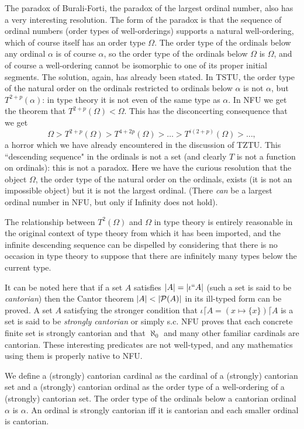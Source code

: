 \documentclass[12pt]{article}
\begin{document}
The paradox of Burali-Forti, the paradox of the largest ordinal number, also has a very interesting resolution.  The form of the paradox is that the sequence of ordinal numbers (order types of well-orderings) supports a natural well-ordering, which of course itself has an order type $\Omega$.  The order type of the ordinals below any ordinal $\alpha$ is of course $\alpha$, so the order type of the ordinals below $\Omega$ is $\Omega$, and of course a well-ordering cannot be isomorphic to one of its proper initial segments.  The solution, again, has already been stated.  In TSTU, the order type of the natural order on the ordinals restricted to ordinals below $\alpha$ is not $\alpha$, but $T^{2+p}(\alpha)$:  in type theory it is not even of the same type as $\alpha$.  In NFU we get the theorem that $T^{2+p}(\Omega) < \Omega$.  This has the disconcerting consequence that we get $$\Omega > T^{2+p}(\Omega) > T^{4+2p}(\Omega) > \ldots > T^{i(2+p)}(\Omega) > \ldots,$$ a horror which we have already encountered in the discussion of TZTU.   This ``descending sequence" in the ordinals is not a set (and clearly $T$ is not a function on ordinals):  this is not a paradox.  Here we have the curious resolution that the object $\Omega$, the order type of the natural order on the ordinals, exists (it is not an impossible object) but it is not the largest ordinal.  (There {\em can\/} be a largest ordinal number in NFU, but only if Infinity does not hold).

The relationship between $T^2(\Omega)$ and $\Omega$ in type theory is entirely reasonable in the original context of type theory from which it has been imported, and the infinite descending sequence can be dispelled by considering that there is no occasion in type theory to suppose that there are infinitely many types below the current type.

It can be noted here that if a set $A$ satisfies $|A| = |\iota``A|$ (such a set is said to be {\em cantorian\/}) then the Cantor theorem $|A| < |{\cal P}(A)|$ in its ill-typed form can be proved.  A set $A$ satisfying the stronger condition
that $\iota\lceil A = (x \mapsto \{x\})\lceil A$ is a set is said to be {\em strongly cantorian\/} or simply s.c.  NFU proves that each concrete finite set is strongly cantorian and that $\aleph_0$ and many other familiar cardinals are cantorian.  These interesting predicates are not well-typed, and any mathematics using them is properly native to NFU.

We define a (strongly) cantorian cardinal as the cardinal of a (strongly) cantorian set and a (strongly) cantorian ordinal as the order type of a well-ordering of a (strongly) cantorian set.  The order type of the ordinals
below a cantorian ordinal $\alpha$ is $\alpha$.  An ordinal is strongly cantorian iff it is cantorian and each smaller ordinal is cantorian.
\end{document}

